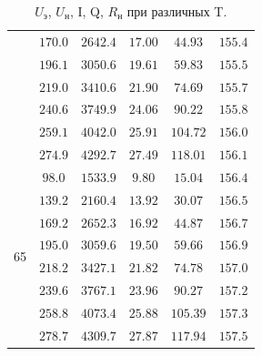 \documentclass[a4paper,12pt]{article}
\begin{document}
\begin{table}[H]
\begin{center}
\begin{tabular}{|c|c|c|c|c|c|}
                    & $170.0$                 & $2642.4$                  & $17.00$        & $44.93$         & $155.4$                   \\\cline{2-6}
                    & $196.1$                 & $3050.6$                  & $19.61$        & $59.83$         & $155.5$                   \\\cline{2-6}
                    & $219.0$                 & $3410.6$                  & $21.90$        & $74.69$         & $155.7$                   \\\cline{2-6}
                    & $240.6$                 & $3749.9$                  & $24.06$        & $90.22$         & $155.8$                   \\\cline{2-6}
                    & $259.1$                 & $4042.0$                  & $25.91$        & $104.72$        & $156.0$                   \\\cline{2-6}
                    & $274.9$                 & $4292.7$                  & $27.49$        & $118.01$        & $156.1$                   \\\hline
      \multirow{8}{*}{65}
                    & $98.0$                  & $1533.9$                  & $9.80$         & $15.04$         & $156.4$                   \\\cline{2-6}
                    & $139.2$                 & $2160.4$                  & $13.92$        & $30.07$         & $156.5$                   \\\cline{2-6}
                    & $169.2$                 & $2652.3$                  & $16.92$        & $44.87$         & $156.7$                   \\\cline{2-6}
                    & $195.0$                 & $3059.6$                  & $19.50$        & $59.66$         & $156.9$                   \\\cline{2-6}
                    & $218.2$                 & $3427.1$                  & $21.82$        & $74.78$         & $157.0$                   \\\cline{2-6}
                    & $239.6$                 & $3767.1$                  & $23.96$        & $90.27$         & $157.2$                   \\\cline{2-6}
                    & $258.8$                 & $4073.4$                  & $25.88$        & $105.39$        & $157.3$                   \\\cline{2-6}
                    & $278.7$                 & $4309.7$                  & $27.87$        & $117.94$        & $157.5$                   \\\hline
    \end{tabular}
  \end{center}
  \caption{$U_\text{э}$, $U_{\text{н}}$, I, Q, $R_{\text{н}}$ при различных T.\label{table:data}}
\end{table}
\end{document}
